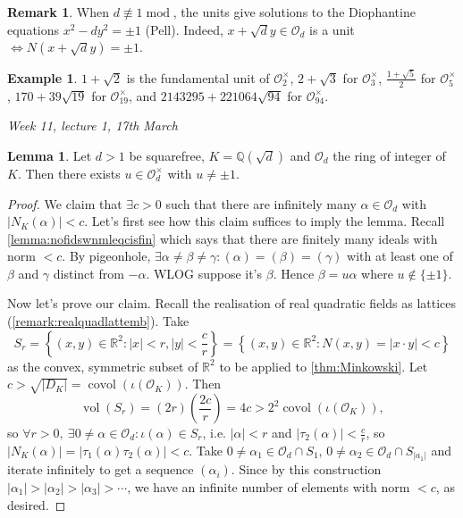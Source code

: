 \documentclass{article}
\newcommand{\Q}{\mathbb{Q}}
\newcommand{\R}{\mathbb{R}}
\newcommand{\Mod}{\operatorname{mod}}
\newcommand{\vol}{\operatorname{vol}}
\newcommand{\covol}{\operatorname{covol}}
\newcommand{\ri}{\mathcal{O}}
\theoremstyle{definition}
\newtheorem{lemma}[defn]{Lemma}
\newtheorem{example}[defn]{Example}
\newtheorem{remark}[defn]{Remark}
\begin{document}
\begin{remark}
When $d\nequiv 1\Mod $, the units give solutions to the Diophantine equations $x^2-dy^2=\pm 1$ (Pell). Indeed, $x+\sqrt dy\in\ri_d$ is a unit $\iff N\left(x+\sqrt{d}y\right)=\pm 1$.
\end{remark}

\begin{example}
$1+\sqrt 2$ is the fundamental unit of $\ri_2^\times$, $2+\sqrt 3$ for $\ri_3^\times$, $\frac{1+\sqrt 5}{2}$ for $\ri_5^\times$, $170+39\sqrt{19}$ for $\ri_{19}^\times$, and $2143295+221064\sqrt{94}$ for $\ri_{94}^\times$.
\end{example}

\begin{flushright}
\textit{Week 11, lecture 1, 17th March}
\end{flushright}

\begin{lemma}
Let $d>1$ be squarefree, $K=\Q\left(\sqrt d\right)$ and $\ri_d$ the ring of integer of $K$. Then there exists $u\in\ri_d^\times$ with $u\neq\pm 1$.
\end{lemma}
\begin{proof}
We claim that $\exists c>0$ such that there are infinitely many $\alpha\in\ri_d$ with $|N_K(\alpha)|<c$. Let's first see how this claim suffices to imply the lemma. Recall \ref{lemma:nofidswnmleqcisfin} which says that there are finitely many ideals with norm $<c$. By pigeonhole, $\exists\alpha\neq\beta\neq\gamma:(\alpha)=(\beta)=(\gamma)$ with at least one of $\beta$ and $\gamma$ distinct from $-\alpha$. WLOG suppose it's $\beta$. Hence $\beta=u\alpha$ where $u\notin\{\pm 1\}$.

Now let's prove our claim. Recall the realisation of real quadratic fields as lattices (\ref{remark:realquadlattemb}). Take
\[
S_r=\left\{(x,y)\in\R^2:|x|<r,|y|<\frac{c}{r}\right\}=\left\{(x,y)\in\R^2:N(x,y)=|x\cdot y|<c\right\}
\]
as the convex, symmetric subset of $\R^2$ to be applied to \ref{thm:Minkowski}. Let $c>\sqrt{|D_K|}=\covol(\iota(\ri_K))$. Then
\[
\vol(S_r)=(2r)\left(\frac{2c}{r}\right)=4c>2^2\covol(\iota(\ri_K)),
\]
so $\forall r>0,\ \exists 0\neq\alpha\in\ri_d:\iota(\alpha)\in S_r$, i.e. $|\alpha|<r$ and $|\tau_2(\alpha)|<\frac{c}{r}$, so $|N_K(\alpha)|=|\tau_1(\alpha)\tau_2(\alpha)|<c$. Take $0\neq\alpha_1\in\ri_d\cap S_1$, $0\neq\alpha_2\in\ri_d\cap S_{|a_1|}$ and iterate infinitely to get a sequence $(\alpha_i)$. Since by this construction $|\alpha_1|>|\alpha_2|>|\alpha_3|>\cdots$, we have an infinite number of elements with norm $<c$, as desired.
\end{proof}
\end{document}
